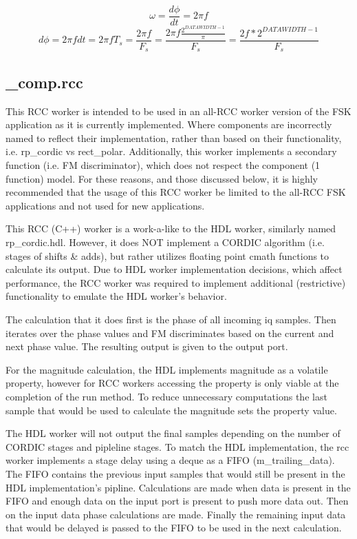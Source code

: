 \begin{equation} \label{eq:3}
	\omega = \frac{d\phi}{dt} = {2 \pi f}
\end{equation}
\begin{equation} \label{eq:4}
	d\phi = {2 \pi f dt} = {2 \pi f T_s} = \frac{2 \pi f}{F_s} = \frac{2 \pi f \frac{2^{DATAWIDTH-1}}{\pi}}{F_s} = \frac{2f*2^{DATAWIDTH-1}}{F_s}
\end{equation}
\newpage
\subsection*{\rcc_comp.rcc}
This RCC worker is intended to be used in an all-RCC worker version of the FSK application
as it is currently implemented. Where components are incorrectly named to reflect their implementation, rather than based on their functionality, i.e. rp\_cordic vs rect\_polar.
Additionally, this worker implements a secondary function (i.e. FM discriminator), which does not respect the component (1 function) model.
For these reasons, and those discussed below, it is highly recommended that the usage of this RCC worker be limited to the all-RCC FSK applications and not used for new applications.

This RCC (C++) worker is a work-a-like to the HDL worker, similarly named rp\_cordic.hdl.
However, it does NOT implement a CORDIC algorithm (i.e. stages of shifts \& adds), but rather utilizes floating point cmath functions to calculate its output.
Due to HDL worker implementation decisions, which affect performance, the RCC worker was required to implement additional (restrictive) functionality to emulate the HDL worker's behavior.

The calculation that it does first is the phase of all incoming iq samples. Then iterates over the phase values and FM discriminates based on the current and next phase value. 
The resulting output is given to the output port.

For the magnitude calculation, the HDL implements magnitude as a volatile property, however for RCC workers accessing the property is only viable at the completion of the run method. 
To reduce unnecessary computations the last sample that would be used to calculate the magnitude sets the property value.
 
The HDL worker will not output the final samples depending on the number of CORDIC stages and pipleline stages. 
To match the HDL implementation, the rcc worker implements a stage delay using a deque as a FIFO (m\_trailing\_data).
The FIFO contains the previous input samples that would still be present in the HDL implementation's pipline. 
Calculations are made when data is present in the FIFO and enough data on the input port is present to push more data out.
Then on the input data phase calculations are made.
Finally the remaining input data that would be delayed is passed to the FIFO to be used in the next calculation.  

